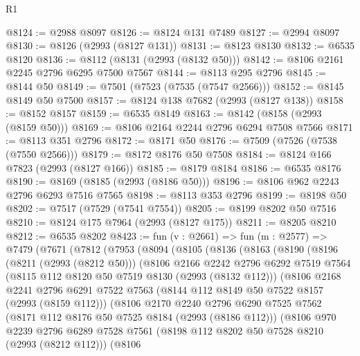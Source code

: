 \begin{lexlean}{R1}
\begin{coremodule}
@8124 := @2988 @8097
@8126 := @8124 @131 @7489
@8127 := @2994 @8097
@8130 := @8126 (@2993 (@8127 @131))
@8131 := @8123 @8130
@8132 := @6535 @8120
@8136 := @8112 (@8131 (@2993 (@8132 @50)))
@8142 := @8106 @2161 @2245 @2796 @6295 @7500 @7567
@8144 := @8113 @295 @2796
@8145 := @8144 @50
@8149 := @7501 (@7523 (@7535 (@7547 @2566)))
@8152 := @8145 @8149 @50 @7500
@8157 := @8124 @138 @7682 (@2993 (@8127 @138))
@8158 := @8152 @8157
@8159 := @6535 @8149
@8163 := @8142 (@8158 (@2993 (@8159 @50)))
@8169 := @8106 @2164 @2244 @2796 @6294 @7508 @7566
@8171 := @8113 @351 @2796
@8172 := @8171 @50
@8176 := @7509 (@7526 (@7538 (@7550 @2566)))
@8179 := @8172 @8176 @50 @7508
@8184 := @8124 @166 @7823 (@2993 (@8127 @166))
@8185 := @8179 @8184
@8186 := @6535 @8176
@8190 := @8169 (@8185 (@2993 (@8186 @50)))
@8196 := @8106 @962 @2243 @2796 @6293 @7516 @7565
@8198 := @8113 @353 @2796
@8199 := @8198 @50
@8202 := @7517 (@7529 (@7541 @7554))
@8205 := @8199 @8202 @50 @7516
@8210 := @8124 @175 @7964 (@2993 (@8127 @175))
@8211 := @8205 @8210
@8212 := @6535 @8202
@8423 := fun (v : @2661) =>
  fun (m : @2577) =>
  @7479
    (@7671
      (@7812
        (@7953
          (@8094
            (@8105
              (@8136
                (@8163
                  (@8190
                    (@8196
                      (@8211 (@2993 (@8212 @50)))
                      (@8106
                        @2166
                        @2242
                        @2796
                        @6292
                        @7519
                        @7564
                        (@8115 @112 @8120 @50 @7519 @8130 (@2993 (@8132 @112)))
                        (@8106
                          @2168
                          @2241
                          @2796
                          @6291
                          @7522
                          @7563
                          (@8144 @112 @8149 @50 @7522 @8157 (@2993 (@8159 @112)))
                          (@8106
                            @2170
                            @2240
                            @2796
                            @6290
                            @7525
                            @7562
                            (@8171 @112 @8176 @50 @7525 @8184 (@2993 (@8186 @112)))
                            (@8106
                              @970
                              @2239
                              @2796
                              @6289
                              @7528
                              @7561
                              (@8198 @112 @8202 @50 @7528 @8210 (@2993 (@8212 @112)))
                              (@8106

\end{coremodule}
\end{lexlean}
